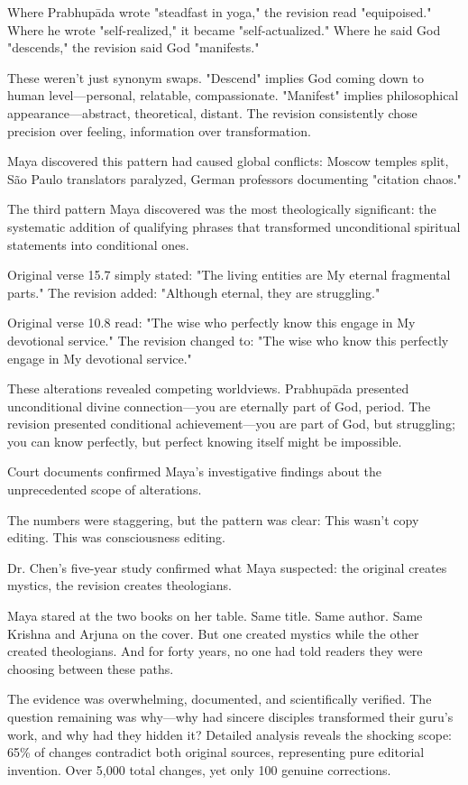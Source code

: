 \documentclass[11pt,twoside]{book}
\begin{document}
Where Prabhupāda wrote "steadfast in yoga," the revision read "equipoised." Where he wrote "self-realized," it became "self-actualized." Where he said God "descends," the revision said God "manifests." 

These weren't just synonym swaps. "Descend" implies God coming down to human level—personal, relatable, compassionate. "Manifest" implies philosophical appearance—abstract, theoretical, distant. The revision consistently chose precision over feeling, information over transformation.

Maya discovered this pattern had caused global conflicts: Moscow temples split, São Paulo translators paralyzed, German professors documenting "citation chaos."

The third pattern Maya discovered was the most theologically significant: the systematic addition of qualifying phrases that transformed unconditional spiritual statements into conditional ones.

Original verse 15.7 simply stated: "The living entities are My eternal fragmental parts."
The revision added: "Although eternal, they are struggling."

Original verse 10.8 read: "The wise who perfectly know this engage in My devotional service."
The revision changed to: "The wise who know this perfectly engage in My devotional service."

These alterations revealed competing worldviews. Prabhupāda presented unconditional divine connection—you are eternally part of God, period. The revision presented conditional achievement—you are part of God, but struggling; you can know perfectly, but perfect knowing itself might be impossible.

Court documents confirmed Maya's investigative findings about the unprecedented scope of alterations.

The numbers were staggering, but the pattern was clear: This wasn't copy editing. This was consciousness editing.

Dr. Chen's five-year study confirmed what Maya suspected: the original creates mystics, the revision creates theologians.

Maya stared at the two books on her table. Same title. Same author. Same Krishna and Arjuna on the cover. But one created mystics while the other created theologians. And for forty years, no one had told readers they were choosing between these paths.

The evidence was overwhelming, documented, and scientifically verified. The question remaining was why—why had sincere disciples transformed their guru's work, and why had they hidden it?
Detailed analysis reveals the shocking scope: 65\% of changes contradict both original sources, representing pure editorial invention. Over 5,000 total changes, yet only 100 genuine corrections.
\end{document}
